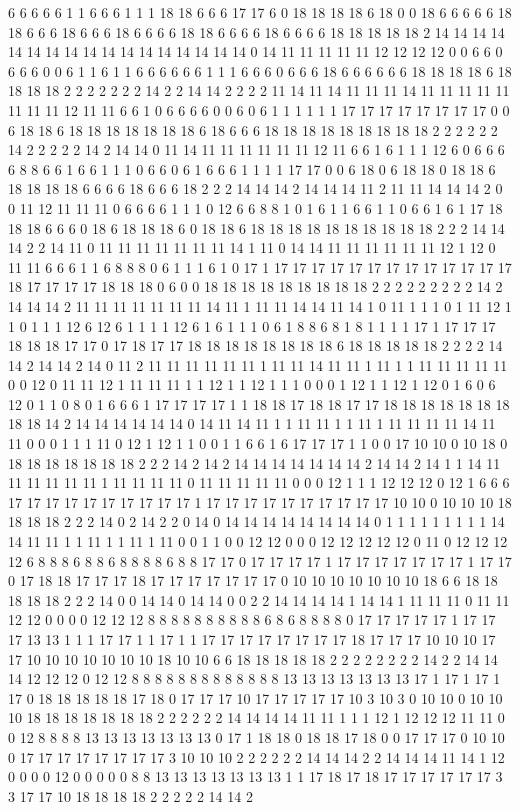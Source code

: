 6 6 6 6 6 1 1 6 6 6 1 1 1 18 18 6 6 6 17 17 6 0 18 18 18 18 6 18 0 0 18 6 6 6 6 6 18 18 6 6 6 18 6 6 6 18 6 6 6 6 18 18 6 6 6 6 18 6 6 6 6 18 18 18 18 18 2 14 14 14 14 14 14 14 14 14 14 14 14 14 14 14 14 14 0 14 11 11 11 11 11 12 12 12 12 0 0 6 6 0 6 6 6 0 0 6 1 1 6 1 1 6 6 6 6 6 6 1 1 1 6 6 6 0 6 6 6 18 6 6 6 6 6 6 18 18 18 18 6 18 18 18 18 2 2 2 2 2 2 2 14 2 2 14 14 2 2 2 2 11 14 11 14 11 11 11 14 11 11 11 11 11 11 11 11 12 11 11 6 6 1 0 6 6 6 6 0 0 6 0 6 1 1 1 1 1 1 17 17 17 17 17 17 17 17 0 0 6 18 18 6 18 18 18 18 18 18 18 6 18 6 6 6 18 18 18 18 18 18 18 18 18 2 2 2 2 2 2 14 2 2 2 2 2 14 2 14 14 0 11 14 11 11 11 11 11 11 12 11 6 6 1 6 1 1 1 12 6 0 6 6 6 6 8 8 6 6 1 6 6 1 1 1 0 6 6 0 6 1 6 6 6 1 1 1 1 17 17 0 0 6 18 0 6 18 18 0 18 18 6 18 18 18 18 6 6 6 6 18 6 6 6 18 2 2 2 14 14 14 2 14 14 14 11 2 11 11 14 14 14 2 0 0 11 12 11 11 11 0 6 6 6 6 1 1 1 0 12 6 6 8 8 1 0 1 6 1 1 6 6 1 1 0 6 6 1 6 1 17 18 18 18 6 6 6 0 18 6 18 18 18 6 0 18 18 6 18 18 18 18 18 18 18 18 18 18 2 2 2 14 14 14 2 2 14 11 0 11 11 11 11 11 11 11 14 1 11 0 14 14 11 11 11 11 11 11 12 1 12 0 11 11 6 6 6 1 1 6 8 8 8 0 6 1 1 1 6 1 0 17 1 17 17 17 17 17 17 17 17 17 17 17 17 17 18 17 17 17 17 18 18 18 0 6 0 0 18 18 18 18 18 18 18 18 18 2 2 2 2 2 2 2 2 2 14 2 14 14 14 2 11 11 11 11 11 11 11 14 11 1 11 11 14 14 11 14 1 0 11 1 1 1 0 1 11 12 1 1 0 1 1 1 12 6 12 6 1 1 1 1 12 6 1 6 1 1 1 0 6 1 8 8 6 8 1 8 1 1 1 1 17 1 17 17 17 18 18 18 17 17 0 17 18 17 17 18 18 18 18 18 18 18 18 6 18 18 18 18 18 2 2 2 2 14 14 2 14 14 2 14 0 11 2 11 11 11 11 11 11 1 11 11 14 11 11 1 11 1 1 11 11 11 11 11 0 0 12 0 11 11 12 1 11 11 11 1 1 12 1 1 12 1 1 1 0 0 0 1 12 1 1 12 1 12 0 1 6 0 6 12 0 1 1 0 8 0 1 6 6 6 1 17 17 17 17 1 1 18 18 17 18 18 17 17 18 18 18 18 18 18 18 18 18 14 2 14 14 14 14 14 14 0 14 11 14 11 1 1 11 11 1 1 11 1 11 11 11 11 14 11 11 0 0 0 1 1 1 11 0 12 1 12 1 1 0 0 1 1 6 6 1 6 17 17 17 1 1 0 0 17 10 10 0 10 18 0 18 18 18 18 18 18 18 2 2 2 14 2 14 2 14 14 14 14 14 14 14 2 14 14 2 14 1 1 14 11 11 11 11 11 11 1 11 11 11 11 0 11 11 11 11 11 0 0 0 12 1 1 1 12 12 12 0 12 1 6 6 6 17 17 17 17 17 17 17 17 17 17 1 17 17 17 17 17 17 17 17 17 17 10 10 0 10 10 10 18 18 18 18 2 2 2 14 0 2 14 2 2 0 14 0 14 14 14 14 14 14 14 14 0 1 1 1 1 1 1 1 1 1 14 14 11 11 1 1 11 1 1 11 1 11 0 0 1 1 0 0 12 12 0 0 0 12 12 12 12 12 0 11 0 12 12 12 12 6 8 8 8 6 8 8 6 8 8 8 8 6 8 8 17 17 0 17 17 17 17 1 17 17 17 17 17 17 17 1 17 17 0 17 18 18 17 17 17 18 17 17 17 17 17 17 17 0 10 10 10 10 10 10 10 18 6 6 18 18 18 18 18 2 2 2 14 0 0 14 14 0 14 14 0 0 2 2 14 14 14 14 1 14 14 1 11 11 11 0 11 11 12 12 0 0 0 0 12 12 12 8 8 8 8 8 8 8 8 8 8 6 8 6 8 8 8 8 0 17 17 17 17 17 1 17 17 17 13 13 1 1 1 17 17 1 1 17 1 1 17 17 17 17 17 17 17 17 18 17 17 17 10 10 10 17 17 10 10 10 10 10 10 10 18 10 10 6 6 18 18 18 18 18 2 2 2 2 2 2 2 2 14 2 2 14 14 14 12 12 12 0 12 12 8 8 8 8 8 8 8 8 8 8 8 8 8 13 13 13 13 13 13 13 17 1 17 1 17 1 17 0 18 18 18 18 18 17 18 0 17 17 17 10 17 17 17 17 17 10 3 10 3 0 10 10 0 10 10 10 18 18 18 18 18 18 18 2 2 2 2 2 2 14 14 14 14 11 11 1 1 1 12 1 12 12 12 11 11 0 0 12 8 8 8 8 13 13 13 13 13 13 13 0 17 1 18 18 0 18 18 17 18 0 0 17 17 17 0 10 10 0 17 17 17 17 17 17 17 17 3 10 10 10 2 2 2 2 2 2 14 14 14 2 2 14 14 14 11 14 1 12 0 0 0 0 12 0 0 0 0 0 8 8 13 13 13 13 13 13 13 1 1 17 18 17 18 17 17 17 17 17 17 3 3 17 17 10 18 18 18 18 2 2 2 2 2 14 14 2 